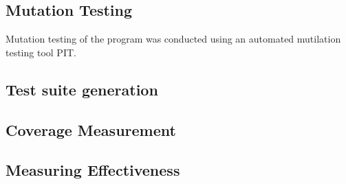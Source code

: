\subsection{Mutation Testing}
Mutation testing of the program was conducted using an automated mutilation testing tool PIT. 
\subsection{Test suite generation}
\subsection{Coverage Measurement}
\subsection{Measuring Effectiveness}